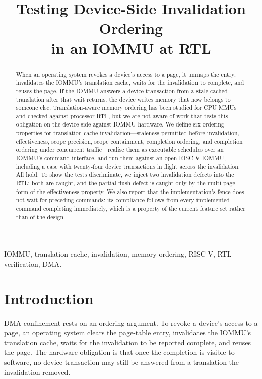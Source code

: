 \documentclass[conference]{IEEEtran}
\begin{document}
\title{Testing Device-Side Invalidation Ordering\\in an IOMMU at RTL}
\author{
}
\maketitle

\begin{abstract}
When an operating system revokes a device's access to a page, it unmaps the
entry, invalidates the IOMMU's translation cache, waits for the invalidation to
complete, and reuses the page. If the IOMMU answers a device transaction from a
stale cached translation after that wait returns, the device writes memory that
now belongs to someone else. Translation-aware memory ordering has been studied
for CPU MMUs and checked against processor RTL, but we are not aware of work
that tests this obligation on the device side against IOMMU hardware. We define
six ordering properties for translation-cache invalidation---staleness
permitted before invalidation, effectiveness, scope precision, scope
containment, completion ordering, and completion ordering under concurrent
traffic---realise them as executable schedules over
an IOMMU's command interface, and run them against an open RISC-V IOMMU,
including a case with twenty-four device transactions in flight across the
invalidation. All hold. To show the tests discriminate, we inject two
invalidation defects into the RTL; both are caught, and the partial-flush defect
is caught only by the multi-page form of the effectiveness property. We also
report that the implementation's fence does not wait for preceding commands: its
compliance follows from every implemented command completing immediately, which
is a property of the current feature set rather than of the design.
\end{abstract}

\begin{IEEEkeywords}
IOMMU, translation cache, invalidation, memory ordering, RISC-V, RTL
verification, DMA.
\end{IEEEkeywords}

\section{Introduction}
DMA confinement rests on an ordering argument. To revoke a device's access to a
page, an operating system clears the page-table entry, invalidates the IOMMU's
translation cache, waits for the invalidation to be reported complete, and
reuses the page. The hardware obligation is that once the completion is visible
to software, no device transaction may still be answered from a translation the
invalidation removed.
\end{document}
